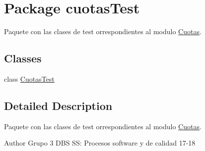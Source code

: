 \hypertarget{namespacecuotas_test}{}\section{Package cuotas\+Test}
\label{namespacecuotas_test}


Paquete con las clases de test orrespondientes al modulo \hyperlink{namespace_cuotas}{Cuotas}.  


\subsection*{Classes}
\begin{DoxyCompactItemize}
\item 
class \hyperlink{classcuotas_test_1_1_cuotas_test}{Cuotas\+Test}
\end{DoxyCompactItemize}


\subsection{Detailed Description}
Paquete con las clases de test orrespondientes al modulo \hyperlink{namespace_cuotas}{Cuotas}. 

\begin{DoxyAuthor}{Author}
Grupo 3 D\+BS SS\+: Procesos software y de calidad 17-\/18 
\end{DoxyAuthor}
